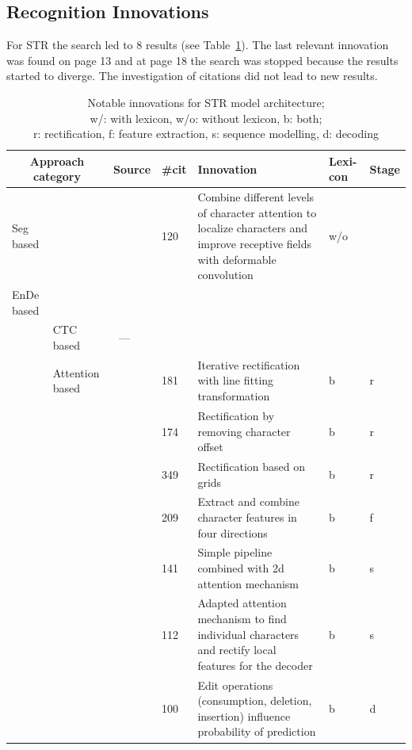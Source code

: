 \subsection{Recognition Innovations}
For \ac{STR} the search led to 8 results (see Table~\ref{tb:STR-steps-properties}).
The last relevant innovation was found on page 13 and at page 18 the search was stopped because
the results started to diverge.
The investigation of citations did not lead to new results.
\begin{table}[h]
    \centering\scriptsize
    \begin{tabular}{p{}p{}p{}p{}
            p{}p{}p{}}
        \multicolumn{2}{c}{Approach category} & Source & \#cit & Innovation & Lexi-con & Stage \\
        \toprule
        Seg based & &~\cite{liao_scene_2018} & 120 & Combine different levels of character attention
            to localize characters and improve receptive fields with deformable convolution & w/o \\
        \midrule
        \ac{EnDe} based & & & \\
            & CTC based &~--- & & \\
            & Attention based &~\cite{zhan_esir_2019} & 181 & Iterative rectification with line fitting
                transformation & b & r \\
            & &~\cite{luo_multi-object_2019} & 174 & Rectification by removing character offset &
                b & r \\
            & &~\cite{shi_aster_2019} & 349 & Rectification based on grids & b & r \\
            & &~\cite{cheng_aon_2018} & 209 & Extract and combine character features in four directions
                & b & f \\
            & &~\cite{li_show_2019} & 141 & Simple pipeline combined with 2d attention mechanism
                & b & s\\
            & &~\cite{liu_char-net_2018} & 112 & Adapted attention mechanism to find
                individual characters and rectify local features for the decoder & b & s \\
            & &~\cite{bai_edit_2018} & 100 & Edit operations (consumption, deletion, insertion)
                influence probability of prediction & b & d \\
        \bottomrule
    \end{tabular}
    \captionsetup{justification=centering}
    \caption[Notable innovations for STR model architecture]{%
        Notable innovations for STR model architecture; \\
        w/: with lexicon, w/o: without lexicon, b: both; \\
        r: rectification, f: feature extraction, s: sequence modelling,
        d: decoding\label{tb:STR-steps-properties}
    }
\end{table}

